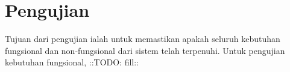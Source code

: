 \section{Pengujian}
\label{sec:pengujian}


Tujuan dari pengujian ialah untuk memastikan apakah seluruh kebutuhan fungsional dan non-fungsional dari sistem telah terpenuhi.
Untuk pengujian kebutuhan fungsional, ::TODO: fill::










